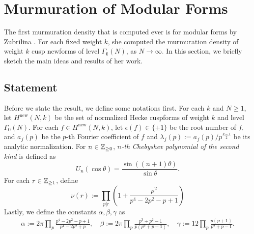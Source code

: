 \section{Murmuration of Modular Forms}
\label{sec:modform}

The first murmuration density that is computed ever is for modular forms by Zubrilina \cite{zubrilina2025murmurations}.
For each fixed weight $k$, she computed the murmuration density of weight $k$ cusp newforms of level $\Gamma_0(N)$, as $N \to \infty$.
In this section, we briefly sketch the main ideas and results of her work.

\subsection{Statement}

Before we state the result, we define some notations first.
For each $k$ and $N \ge 1$, let $H^{\mathrm{new}}(N, k)$ be the set of normalized Hecke cuspforms of weight $k$ and level $\Gamma_0(N)$.
For each $f \in H^{\mathrm{new}}(N, k)$, let $\epsilon(f) \in \{\pm 1\}$ be the root number of $f$, and $a_f(p)$ be the $p$-th Fourier coefficient of $f$ and $\lambda_f(p) := a_f(p) / p^{\frac{k-1}{2}}$ be its analytic normalization.
For $n \in \mathbb{Z}_{\ge 0}$, \emph{$n$-th Chebyshev polynomial of the second kind} is defined as
\[
    U_n(\cos \theta) = \frac{\sin((n+1) \theta)}{\sin\theta}. 
\]
For each $r \in \mathbb{Z}_{\ge 1}$, define
\[
    \nu(r) := \prod_{p | r} \left(1 + \frac{p^2}{p^4 - 2p^2 - p + 1}\right)
\]
Lastly, we define the constants $\alpha, \beta, \gamma$ as
\begin{align*}
    \alpha := 2\pi \prod_{p} \frac{p^4 - 2p^2 - p + 1}{p^4 - 2p^2 + p}, \quad
    \beta := 2\pi \prod_{p} \frac{p^3 + p^2 - 1}{p(p^2 + p - 1)}, \quad
    \gamma := 12 \prod_{p} \frac{p(p + 1)}{p^2 + p - 1}.
\end{align*}
